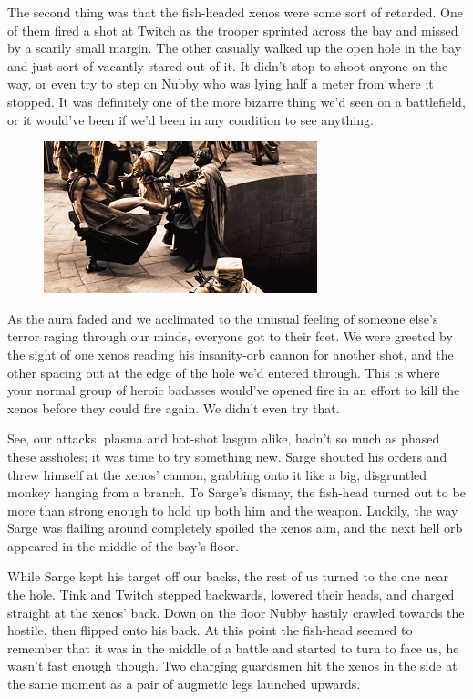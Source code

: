 The second thing was that the fish-headed xenos were some sort of retarded. 
One of them fired a shot at Twitch as the trooper sprinted across the bay and missed by a scarily small margin. 
The other casually walked up the open hole in the bay and just sort of vacantly stared out of it. 
It didn't stop to shoot anyone on the way, or even try to step on Nubby who was lying half a meter from where it stopped. 
It was definitely one of the more bizarre thing we'd seen on a battlefield, or it would've been if we'd been in any condition to see anything.

\begin{figure}
	\begin{center}
		\includegraphics[width=\figwidth]{pics/11/52.png}
	\end{center}
\end{figure}
As the aura faded and we acclimated to the unusual feeling of someone else's terror raging through our minds, everyone got to their feet. 
We were greeted by the sight of one xenos reading his insanity-orb cannon for another shot, and the other spacing out at the edge of the hole we'd entered through. 
This is where your normal group of heroic badasses would've opened fire in an effort to kill the xenos before they could fire again. 
We didn't even try that.

See, our attacks, plasma and hot-shot lasgun alike, hadn't so much as phased these assholes; 
it was time to try something new. 
Sarge shouted his orders and threw himself at the xenos' cannon, grabbing onto it like a big, disgruntled monkey hanging from a branch. 
To Sarge's dismay, the fish-head turned out to be more than strong enough to hold up both him and the weapon. 
Luckily, the way Sarge was flailing around completely spoiled the xenos aim, and the next hell orb appeared in the middle of the bay's floor.

While Sarge kept his target off our backs, the rest of us turned to the one near the hole. 
Tink and Twitch stepped backwards, lowered their heads, and charged straight at the xenos' back. 
Down on the floor Nubby hastily crawled towards the hostile, then flipped onto his back. 
At this point the fish-head seemed to remember that it was in the middle of a battle and started to turn to face us, he wasn't fast enough though. 
Two charging guardsmen hit the xenos in the side at the same moment as a pair of augmetic legs launched upwards.

